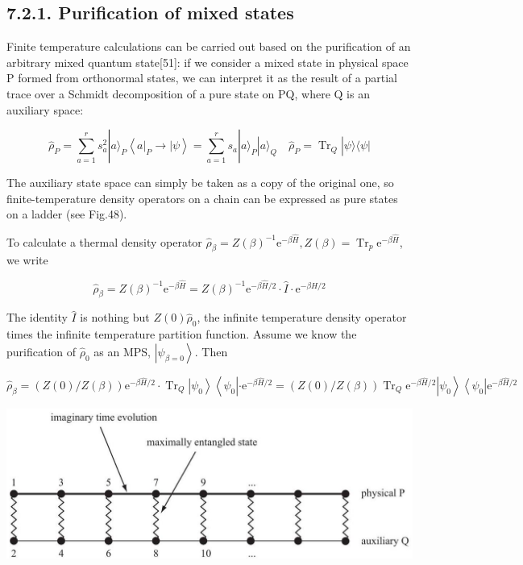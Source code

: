 \documentclass[12pt]{article}
\begin{document}
\subsection*{7.2.1. Purification of mixed states}
Finite temperature calculations can be carried out based on the purification of an arbitrary mixed quantum state[51]: if we consider a mixed state in physical space P formed from orthonormal states, we can interpret it as the result of a partial trace over a Schmidt decomposition of a pure state on $\mathrm{PQ}$, where $\mathrm{Q}$ is an auxiliary space:


\begin{equation*}
\hat{\rho}_{P}=\sum_{a=1}^{r} s_{a}^{2}|a\rangle_{P}\left\langle\left. a\right|_{P} \rightarrow \mid \psi\right\rangle=\sum_{a=1}^{r} s_{a}|a\rangle_{P}|a\rangle_{Q} \quad \hat{\rho}_{P}=\operatorname{Tr}_{Q}|\psi\rangle\langle\psi| \tag{234}
\end{equation*}


The auxiliary state space can simply be taken as a copy of the original one, so finite-temperature density operators on a chain can be expressed as pure states on a ladder (see Fig.48).

To calculate a thermal density operator $\hat{\rho}_{\beta}=Z(\beta)^{-1} \mathrm{e}^{-\beta \hat{H}}, Z(\beta)=\operatorname{Tr}_{p} \mathrm{e}^{-\beta \hat{H}}$, we write


\begin{equation*}
\hat{\rho}_{\beta}=Z(\beta)^{-1} \mathrm{e}^{-\beta \hat{H}}=Z(\beta)^{-1} \mathrm{e}^{-\beta \hat{H} / 2} \cdot \hat{I} \cdot \mathrm{e}^{-\beta \hat{H} / 2} \tag{235}
\end{equation*}


The identity $\hat{I}$ is nothing but $Z(0) \hat{\rho}_{0}$, the infinite temperature density operator times the infinite temperature partition function. Assume we know the purification of $\hat{\rho}_{0}$ as an MPS, $\left|\psi_{\beta=0}\right\rangle$. Then


\begin{equation*}
\hat{\rho}_{\beta}=(Z(0) / Z(\beta)) \mathrm{e}^{-\beta \hat{H} / 2} \cdot \operatorname{Tr}_{Q}\left|\psi_{0}\right\rangle\left\langle\psi_{0}\left|\cdot \mathrm{e}^{-\beta \hat{H} / 2}=(Z(0) / Z(\beta)) \operatorname{Tr}_{Q} \mathrm{e}^{-\beta \hat{H} / 2}\right| \psi_{0}\right\rangle\left\langle\psi_{0}\right| \mathrm{e}^{-\beta \hat{H} / 2} \tag{236}
\end{equation*}


\begin{center}
\includegraphics[max width=\textwidth]{2024_05_04_afc4ad226da9ccfe0ac8g-079}
\end{center}
\end{document}
